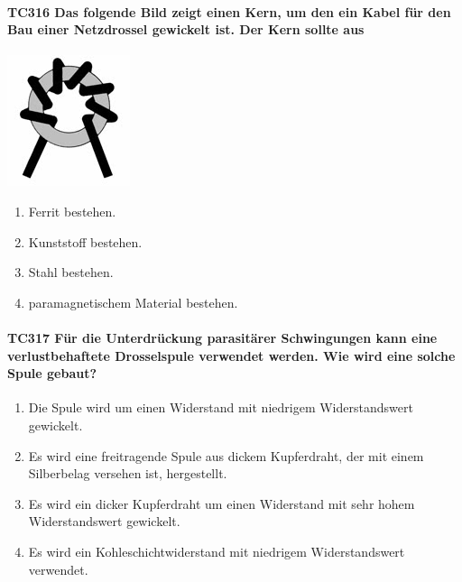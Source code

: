 \documentclass[8pt]{article}
\begin{document}
\begin{enumerate}
\begin{enumerate}[nolistsep,label=\Alph*]
{\paragraph*{TC316 Das folgende Bild zeigt einen Kern, um den ein Kabel für den Bau einer Netzdrossel gewickelt ist. Der Kern sollte aus}
\begin{center}
	\begin{minipage}{\linewidth}
		\centering
		\includegraphics[scale=1.0]{pics/tc316_a.jpg}
	\end{minipage}
\end{center}
\begin{enumerate}[nolistsep,label=\Alph*]
\item Ferrit bestehen.
\item Kunststoff bestehen.
\item Stahl bestehen.
\item paramagnetischem Material bestehen.
\end{enumerate}

\paragraph*{TC317 Für die Unterdrückung parasitärer Schwingungen kann eine verlustbehaftete Drosselspule verwendet werden. Wie wird eine solche Spule gebaut?}
\begin{enumerate}[nolistsep,label=\Alph*]
\item Die Spule wird um einen Widerstand mit niedrigem Widerstandswert gewickelt. 
\item Es wird eine freitragende Spule aus dickem Kupferdraht, der mit einem Silberbelag versehen ist, hergestellt.
\item Es wird ein dicker Kupferdraht um einen Widerstand mit sehr hohem Widerstandswert gewickelt.
\item Es wird ein Kohleschichtwiderstand mit niedrigem Widerstandswert verwendet.
\end{enumerate}

}
\end{enumerate}
\end{enumerate}
\end{document}
